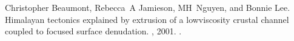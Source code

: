 \documentclass[letterpaper,10pt,english]{jupyterBook}
\begin{document}
\begin{sphinxthebibliography}{10}
\sphinxAtStartPar
Christopher Beaumont, Rebecca A Jamieson, MH Nguyen, and Bonnie Lee. Himalayan tectonics explained by extrusion of a low\sphinxhyphen{}viscosity crustal channel coupled to focused surface denudation. , 2001. .
\end{sphinxthebibliography}







\renewcommand{\indexname}{Index}
\printindex
\end{document}
